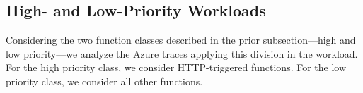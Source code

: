 \subsection{High- and Low-Priority Workloads}
\label{sec:motivation:workload}
Considering the two function classes described in the prior subsection---high and low priority---we analyze the Azure traces applying this division in the workload.
For the high priority class, we consider HTTP-triggered functions.
For the low priority class, we consider all other functions.


